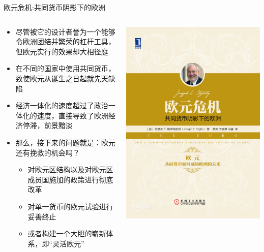 \documentclass[10pt,hyperref={CJKbookmarks=true},xcolor=dvipsnames,aspectratio=169]{beamer}
\begin{document}
\begin{frame}{欧元危机:共同货币阴影下的欧洲}
\begin{columns}[onlytextwidth]
	\begin{column}{0.6\textwidth}
		\begin{itemize}
			\item 尽管被它的设计者誉为一个能够令欧洲团结并繁荣的杠杆工具，但欧元实行的效果却大相径庭
			\item 在不同的国家中使用共同货币，致使欧元从诞生之日起就先天缺陷
			\item 经济一体化的速度超过了政治一体化的速度，直接导致了欧洲经济停滞，前景黯淡
			\item 那么，接下来的问题就是：欧元还有挽救的机会吗？
			\begin{itemize}
				\item 对欧元区结构以及对欧元区成员国施加的政策进行彻底改革
				\item 对单一货币的欧元试验进行妥善终止
				\item 或者构建一个大胆的崭新体系，即“灵活欧元”
			\end{itemize}
		\end{itemize}
	\end{column}
	\begin{column}{0.4\textwidth}
		\centering
		\includegraphics[scale=0.3]{fig/euro/stiglitz}
	\end{column}
\end{columns}
\end{frame}	
\end{document}
